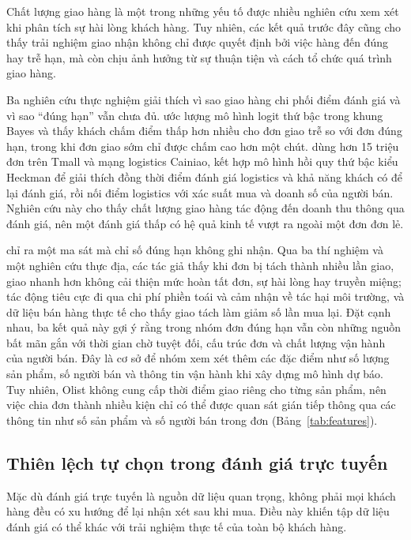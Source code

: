 \documentclass[12pt,a4paper]{report}
\begin{document}
Chất lượng giao hàng là một trong những yếu tố được nhiều nghiên cứu xem xét khi phân tích sự hài lòng khách hàng. Tuy nhiên, các kết quả trước đây cũng cho thấy trải nghiệm giao nhận không chỉ được quyết định bởi việc hàng đến đúng hay trễ hạn, mà còn chịu ảnh hưởng từ sự thuận tiện và cách tổ chức quá trình giao hàng.

Ba nghiên cứu thực nghiệm giải thích vì sao giao hàng chi phối điểm đánh giá và vì sao ``đúng hạn'' vẫn chưa đủ. \textcite{ravula2023} ước lượng mô hình logit thứ bậc trong khung Bayes và thấy khách chấm điểm thấp hơn nhiều cho đơn giao trễ so với đơn đúng hạn, trong khi đơn giao sớm chỉ được chấm cao hơn một chút. \textcite{deshpande2023} dùng hơn 15 triệu đơn trên Tmall và mạng logistics Cainiao, kết hợp mô hình hồi quy thứ bậc kiểu Heckman để giải thích đồng thời điểm đánh giá logistics và khả năng khách có để lại đánh giá, rồi nối điểm logistics với xác suất mua và doanh số của người bán. Nghiên cứu này cho thấy chất lượng giao hàng tác động đến doanh thu thông qua đánh giá, nên một đánh giá thấp có hệ quả kinh tế vượt ra ngoài một đơn đơn lẻ.

\textcite{brylla2022} chỉ ra một ma sát mà chỉ số đúng hạn không ghi nhận. Qua ba thí nghiệm và một nghiên cứu thực địa, các tác giả thấy khi đơn bị tách thành nhiều lần giao, giao nhanh hơn không cải thiện mức hoàn tất đơn, sự hài lòng hay truyền miệng; tác động tiêu cực đi qua chi phí phiền toái và cảm nhận về tác hại môi trường, và dữ liệu bán hàng thực tế cho thấy giao tách làm giảm số lần mua lại. Đặt cạnh nhau, ba kết quả này gợi ý rằng trong nhóm đơn đúng hạn vẫn còn những nguồn bất mãn gắn với thời gian chờ tuyệt đối, cấu trúc đơn và chất lượng vận hành của người bán. Đây là cơ sở để nhóm xem xét thêm các đặc điểm như số lượng sản phẩm, số người bán và thông tin vận hành khi xây dựng mô hình dự báo. Tuy nhiên, Olist không cung cấp thời điểm giao riêng cho từng sản phẩm, nên việc chia đơn thành nhiều kiện chỉ có thể được quan sát gián tiếp thông qua các thông tin như số sản phẩm và số người bán trong đơn (Bảng~\ref{tab:features}).

\subsection{Thiên lệch tự chọn trong đánh giá trực tuyến}\label{sec:rel-selection}

Mặc dù đánh giá trực tuyến là nguồn dữ liệu quan trọng, không phải mọi khách hàng đều có xu hướng để lại nhận xét sau khi mua. Điều này khiến tập dữ liệu đánh giá có thể khác với trải nghiệm thực tế của toàn bộ khách hàng.
\end{document}
